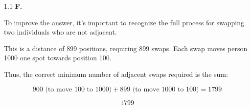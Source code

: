 \begin{tcolorbox}
\begin{spacing}{1.1}
\textbf{F.}

\textbf{\color{purple}{</critic>}}  

\textbf{\color{purple}{<revised>}}  

To improve the answer, it’s important to recognize the full process for swapping two individuals who are not adjacent.

\vspace{\medskipamount}
\textit{\color{gray}{( ... more reasoning tokens omitted for brevity )}} 

This is a distance of 899 positions, requiring 899 swaps. Each swap moves person 1000 one spot towards position 100.

Thus, the correct minimum number of adjacent swaps required is the sum:

\[
900 \text{ (to move 100 to 1000)} + 899 \text{ (to move 1000 to 100)} = 1799
\]

\[
\boxed{1799}
\]

\textbf{\color{purple}{<revised>}}  
\end{spacing}

\end{tcolorbox}
